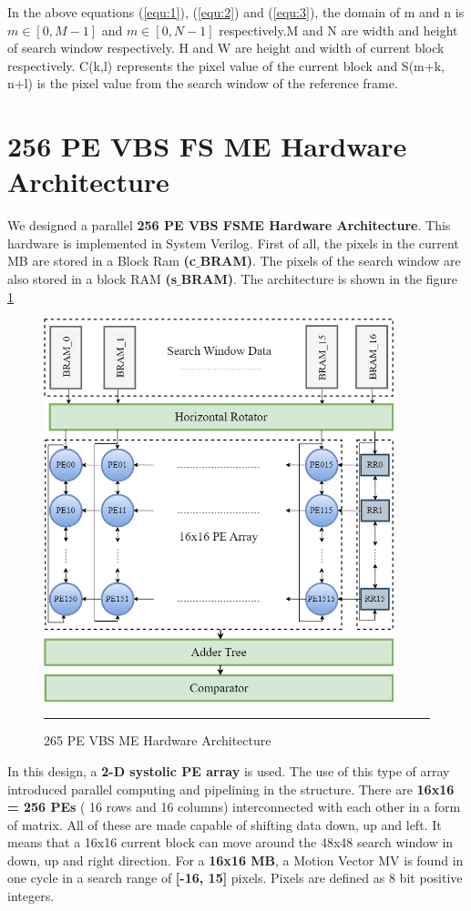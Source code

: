In the above equations (\ref{equ:1}), (\ref{equ:2}) and (\ref{equ:3}), the domain of m and n is $m \in [0, M-1] $ and $m \in [0, N-1]$ respectively.M and N are width and height of search window respectively. H and W are height and width of current block respectively. C(k,l) represents the pixel value of the current block and S(m+k, n+l) is the pixel value from the search window of the reference frame\cite{li2003serial}.

\section{256 PE VBS FS ME Hardware Architecture}
We designed a parallel \textbf{256 PE VBS FSME Hardware Architecture}. \cite{kalaycioglu2011low} This hardware is implemented in System Verilog. First of all, the pixels in the current MB are stored in a Block Ram \textbf{(c$\_$BRAM)}. The pixels of the search window are also stored in a block RAM \textbf{(s$\_$BRAM)}. The architecture is shown in the figure \ref{fig:256pevbsme}

\begin{figure}[H]
	\centering
	\includegraphics[width = 4in]{./Figures/256pevbsme.png}
	\rule{35em}{0.5pt}
	\caption{265 PE VBS ME Hardware Architecture}
	\label{fig:256pevbsme}
\end{figure}

In this design, a \textbf{2-D systolic PE array} is used. The use of this type of array introduced parallel computing and pipelining in the structure. There are \textbf{16x16 = 256 PEs} ( 16 rows and 16 columns) interconnected with each other in a form of matrix. All of these are  made capable of shifting data down, up and left. It means that a 16x16 current block can move around the 48x48 search window in down, up and right direction. For a \textbf{16x16 MB}, a Motion Vector MV is found in one cycle in a search range of \textbf{[-16, 15]} pixels. Pixels are defined as 8 bit positive integers.

